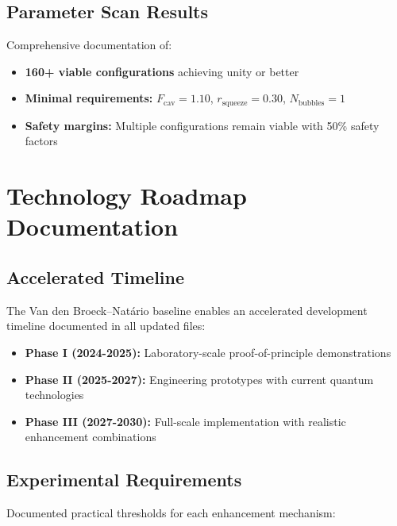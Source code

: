 \documentclass[11pt]{article}
\begin{document}
\subsection{Parameter Scan Results}
Comprehensive documentation of:
\begin{itemize}
\item \textbf{160+ viable configurations} achieving unity or better
\item \textbf{Minimal requirements:} $F_{\text{cav}} = 1.10$, $r_{\text{squeeze}} = 0.30$, $N_{\text{bubbles}} = 1$
\item \textbf{Safety margins:} Multiple configurations remain viable with 50\% safety factors
\end{itemize}

\section{Technology Roadmap Documentation}

\subsection{Accelerated Timeline}
The Van den Broeck–Natário baseline enables an accelerated development timeline documented in all updated files:

\begin{itemize}
\item \textbf{Phase I (2024-2025):} Laboratory-scale proof-of-principle demonstrations
\item \textbf{Phase II (2025-2027):} Engineering prototypes with current quantum technologies
\item \textbf{Phase III (2027-2030):} Full-scale implementation with realistic enhancement combinations
\end{itemize}

\subsection{Experimental Requirements}
Documented practical thresholds for each enhancement mechanism:
\end{document}
